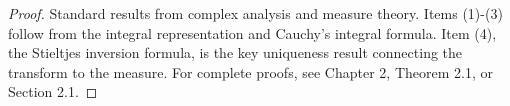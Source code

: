 \begin{proof}
Standard results from complex analysis and measure theory. Items (1)-(3) follow from the integral representation and Cauchy's integral formula. Item (4), the Stieltjes inversion formula, is the key uniqueness result connecting the transform to the measure. For complete proofs, see \cite{bai2010spectral} Chapter 2, Theorem 2.1, or \cite{anderson2010introduction} Section 2.1.
\end{proof}
